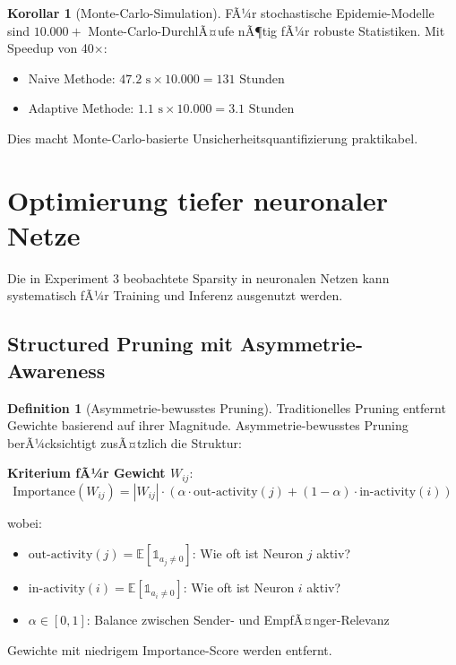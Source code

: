 ﻿\documentclass[a4paper,12pt]{report}
\theoremstyle{definition}
\newtheorem{definition}{Definition}
\newtheorem{korollar}{Korollar}
\begin{document}
	\begin{korollar}[Monte-Carlo-Simulation]
		FÃ¼r stochastische Epidemie-Modelle sind $10.000+$ Monte-Carlo-DurchlÃ¤ufe nÃ¶tig fÃ¼r robuste Statistiken. Mit Speedup von 40$\times$:
		\begin{itemize}
			\item Naive Methode: $47.2 \text{ s} \times 10.000 = 131 \text{ Stunden}$
			\item Adaptive Methode: $1.1 \text{ s} \times 10.000 = 3.1 \text{ Stunden}$
		\end{itemize}
		
		Dies macht Monte-Carlo-basierte Unsicherheitsquantifizierung praktikabel.
	\end{korollar}
	
	\section{Optimierung tiefer neuronaler Netze}
	
	Die in Experiment 3 beobachtete Sparsity in neuronalen Netzen kann systematisch fÃ¼r Training und Inferenz ausgenutzt werden.
	
	\subsection{Structured Pruning mit Asymmetrie-Awareness}
	
	\begin{definition}[Asymmetrie-bewusstes Pruning]
		Traditionelles Pruning entfernt Gewichte basierend auf ihrer Magnitude. Asymmetrie-bewusstes Pruning berÃ¼cksichtigt zusÃ¤tzlich die Struktur:
		
		\textbf{Kriterium fÃ¼r Gewicht $W_{ij}$}:
		\[
		\text{Importance}(W_{ij}) = |W_{ij}| \cdot \left( \alpha \cdot \text{out-activity}(j) + (1-\alpha) \cdot \text{in-activity}(i) \right)
		\]
		
		wobei:
		\begin{itemize}
			\item $\text{out-activity}(j) = \mathbb{E}[\mathbb{1}_{a_j \neq 0}]$: Wie oft ist Neuron $j$ aktiv?
			\item $\text{in-activity}(i) = \mathbb{E}[\mathbb{1}_{a_i \neq 0}]$: Wie oft ist Neuron $i$ aktiv?
			\item $\alpha \in [0,1]$: Balance zwischen Sender- und EmpfÃ¤nger-Relevanz
		\end{itemize}
		
		Gewichte mit niedrigem Importance-Score werden entfernt.
	\end{definition}
	
\end{document}
